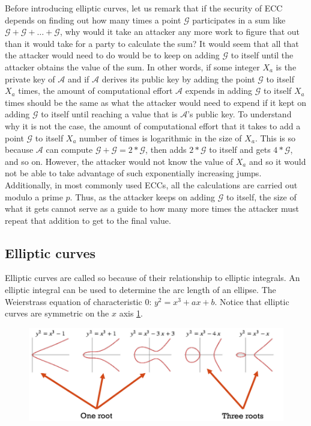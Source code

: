 Before introducing elliptic curves, let us remark that if the security of ECC depends on finding out how many times a point $\mathcal{G}$ participates in a sum like $\mathcal{G} + \mathcal{G} + \ldots + \mathcal{G}$, why would it take an attacker any more work to figure that out than it would take for a party to calculate the sum? It would seem that all that the attacker would need to do would be to keep on adding $\mathcal{G}$ to itself until the attacker obtains the value of the sum. In other words, if some integer $X_a$ is the private key of $\mathcal{A}$ and if $\mathcal{A}$ derives its public key by adding the point $\mathcal{G}$ to itself $X_a$ times, the amount of computational effort $\mathcal{A}$ expends in adding $\mathcal{G}$ to itself $X_a$ times should be the same as what the attacker would need to expend if it kept on adding $\mathcal{G}$ to itself until reaching a value that is $\mathcal{A}$’s public key.
To understand why it is not the case, the amount of computational effort that it takes to add a point $\mathcal{G}$ to itself $X_a$ number of times is logarithmic in the size of $X_a$.
This is so because $\mathcal{A}$ can compute $\mathcal{G} + \mathcal{G} = 2*\mathcal{G}$, then adds $2*\mathcal{G}$ to itself and gets $4*\mathcal{G}$, and so on. However, the attacker would not know the value of $X_a$ and so it would not be able to take advantage of such exponentially increasing jumps. Additionally, in most commonly used ECCs, all the calculations are carried out modulo a prime $p$. Thus, as the attacker keeps on adding $\mathcal{G}$ to itself, the size of what it gets cannot serve as a guide to how many more times the attacker must repeat that addition to get to the final value.

\subsection{Elliptic curves}
Elliptic curves are called so because of their relationship to elliptic integrals. An elliptic integral can be used to determine the arc length of an ellipse. The Weierstrass equation of characteristic 0: $y^2 = x^3 + ax + b$. Notice that elliptic curves are symmetric on the $x$ axis \ref{fig:ellipticcurves}.

\begin{figure}
	\centering
	\includegraphics[width=0.7\linewidth]{Images/chapter5/elliptic_curves}
	\caption{}
	\label{fig:ellipticcurves}
\end{figure}

